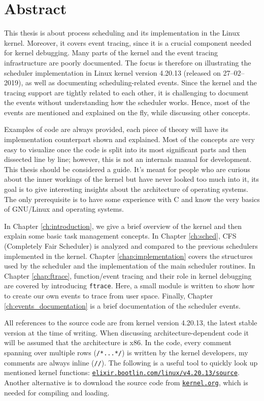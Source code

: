 \chapter{Abstract}
This thesis is about process scheduling and its implementation in the Linux kernel. Moreover, it covers event tracing, since it is a crucial component needed for kernel debugging. 
Many parts of the kernel and the event tracing infrastructure are poorly documented. The focus is therefore on illustrating the scheduler implementation in Linux kernel version 4.20.13 (released on 27--02--2019), as well as documenting scheduling-related events.
Since the kernel and the tracing support are tightly related to each other, it is challenging to document the events without understanding how the scheduler works. Hence, most of the events are mentioned and explained on the fly, while discussing other concepts.

Examples of code are always provided, each piece of theory will have its implementation counterpart shown and explained.
Most of the concepts are very easy to visualize once the code is split into its most significant parts
and then dissected line by line; however, this is not an internals manual for development. 
This thesis should be considered a guide. It's meant for people who are curious about the inner workings of the kernel
but have never looked too much into it, its goal is to give interesting insights about the architecture of operating systems.
The only prerequisite is to have some experience with C and know the very basics of GNU/Linux and operating systems.

In Chapter \ref{ch:introduction}, we give a brief overview of the kernel and then explain some basic task management concepts. 
In Chapter \ref{ch:sched}, CFS (Completely Fair Scheduler) is analyzed and compared to the previous schedulers implemented in the kernel. 
Chapter \ref{chap:implementation} covers the structures used by the scheduler and the implementation of the main scheduler routines.
In Chapter \ref{chap:ftrace}, function/event tracing and their role in kernel debugging are covered by introducing \verb|ftrace|. Here, a small module is written to show how to create our own events to trace from user space.
Finally, Chapter \ref{ch:events_documentation} is a brief documentation of the scheduler events.

All references to the source code are from kernel version 4.20.13, the latest stable version at the time of writing. When discussing architecture-dependent code it will be assumed that the architecture is x86. In the code, every comment spanning over multiple rows (\verb|/*...*/|) is written by the kernel developers, my comments are always inline (\verb|//|). The following is a useful tool to quickly look up mentioned kernel functions: \href{https://elixir.bootlin.com/linux/v4.20.13/source}{\texttt{elixir.bootlin.com/linux/v4.20.13/source}}. Another alternative is to download the source code from \href{https://www.kernel.org/}{\texttt{kernel.org}}, which is needed for compiling and loading. 
